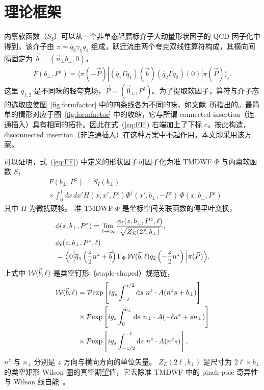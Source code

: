 \section{理论框架}

内禀软函数（$S_I$）可以从一个非单态轻赝标介子大动量形状因子的 QCD 因子化中得到，该介子由 $\pi=\overline{q}_2\gamma_5 q_1$ 组成，跃迁流由两个夸克双线性算符构成，其横向间隔固定为 $\vec{b}=(\vec{n}_\perp b_\perp, 0)$，
\begin{align}\label{eq:FF}
F(b_\perp,P^z)=\langle \pi(-\vec{P})|(\overline{q}_1\Gamma q_1)(\vec{b}) (\overline{q}_2\Gamma q_2)(0)|\pi(\vec P)\rangle_c.
\end{align}
这里 $q_{1,2}$ 是不同味的轻夸克场，$\vec{P}=(\vec{0}_{\perp},P^z)$。{为了提取软因子，算符与介子态的选取应使图~\ref{fig:formfactor} 中的四条线各为不同的味，如文献~\cite{Ji:2019sxk}所指出的。}最简单的情形对应于图~\ref{fig:formfactor} 中的收缩，它与所谓 connected insertion（连通插入）具有相同的拓扑。因此在式~(\ref{eq:FF}) 右端加上了下标 $c$。按此构造，disconnected insertion（非连通插入）在这种方案中不起作用，本文即采用该方案。

可以证明，式~(\ref{eq:FF}) 中定义的形状因子可因子化为准 TMDWF $\Phi$ 与内禀软函数 $S_I$~\cite{Ji:2019sxk,Ji:2020ect}
%
\begin{align}\label{eq:FF_factorization}
&F(b_\perp,P^z)= {S_I(b_\perp)}\\ &\times {\int_0^1 dx\, dx' H(x,x',P^z)\Phi^{\dagger}(x',b_\perp,-P^z)\, \Phi(x,b_\perp,P^z)}\nonumber
\end{align}
其中 $H$ 为{微扰}硬核。
%
准 TMDWF $ \Phi$ 是坐标空间关联函数的傅里叶变换，
\begin{align}
\label{eq:phi_def}&\phi(z,b_\perp,P^z)=\lim_{\ell\to\infty}\frac{\phi_\ell(z,b_\perp,P^z,\ell)}{\sqrt{Z_E(2\ell,b_\perp)}},\\
&\phi_\ell(z,b_\perp,P^z,\ell)\nonumber\\
&=\Big\langle 0\Big|\overline q_1\left(\frac{z }{2}n^z +\vec b\right)\Gamma_\Phi\,{\cal W}(\vec b,\ell)q_2\left(-\frac{z}{2}n^z \right)\Big| {\pi(\vec{P})}\Big\rangle\nonumber.
\end{align}
上式中 ${\cal W}(\vec b,\ell)$ 是类空钉形（staple-shaped）规范链，
\begin{align}
{\cal W}(\vec b,\ell)&= {\cal P}{\rm exp} \left[ ig_s\int_{-\ell}^{z/2} \textrm{d}s\ n^z\cdot  A(n^z s+b_\perp)\right] \nonumber\\
& \times {\cal P}{\rm exp} \left[ ig_s\int_{0}^{b_\perp } \textrm{d}s\ n_\perp\cdot  A(-\ell n^z +s  n_\perp)\right] \nonumber\\
& \times {\cal P}{\rm exp} \left[ ig_s\int_{-z/2}^{-\ell} \textrm{d}s\ n^z\cdot  A(n^z s)\right],
\end{align}
$n^z$ 与 $n_\perp$ 分别是 $z$ 方向与横向方向的单位矢量。
$Z_E(2\ell,b_\perp)$ 是尺寸为 $2\ell \times b_\perp$ 的类空矩形 Wilson 圈的真空期望值，它去除准 TMDWF 中的 pinch-pole 奇异性与 Wilson 线自能~\cite{Ji:2019sxk}。

